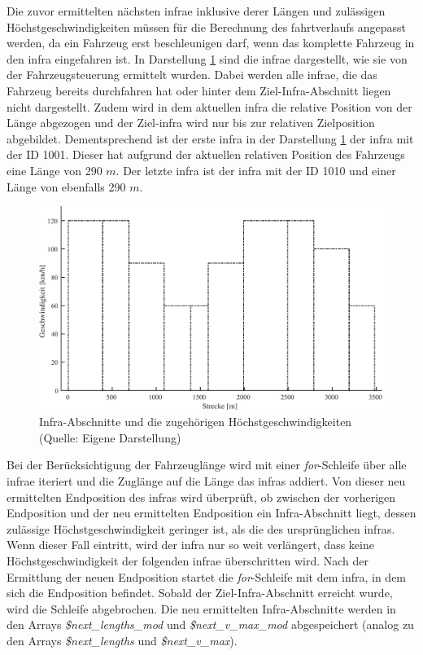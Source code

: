 Die zuvor ermittelten nächsten \ac{infra}e inklusive derer Längen und zulässigen Höchstgeschwindigkeiten müssen für die Berechnung des \Gls{fahrtverlauf}s angepasst werden, da ein Fahrzeug erst beschleunigen darf, wenn das komplette Fahrzeug in den \ac{infra} eingefahren ist. In Darstellung \ref{fig:it1} sind die \ac{infra}e dargestellt, wie sie von der Fahrzeugsteuerung ermittelt wurden. Dabei werden \mbox{alle} \ac{infra}e, die das Fahrzeug bereits durchfahren hat oder hinter dem Ziel-Infra-Abschnitt liegen nicht dargestellt. Zudem wird in dem aktuellen \ac{infra} die relative Position von der Länge abgezogen und der Ziel-\ac{infra} wird nur bis zur relativen Zielposition abgebildet. Dementsprechend ist der erste \ac{infra} in der Darstellung \ref{fig:it1} der \ac{infra} mit der ID 1001. Dieser hat aufgrund der aktuellen relativen Position des Fahrzeugs eine Länge von 290 $m$. Der letzte \ac{infra} ist der \ac{infra} mit der ID 1010 und einer Länge von ebenfalls 290 $m$.
\begin{figure}
  \includegraphics[width=\linewidth]{../images/matlab/it1.pdf}
  \caption[Infra-Abschnitte und die zugehörigen Höchstgeschwindigkeiten]{Infra-Abschnitte und die zugehörigen Höchstgeschwindigkeiten (Quelle: Eigene Darstellung)}
  \label{fig:it1}
\end{figure}

Bei der Berücksichtigung der Fahrzeuglänge wird mit einer \textit{for}-Schleife über \mbox{alle} \ac{infra}e iteriert und die Zuglänge auf die Länge das \ac{infra}s addiert. Von dieser neu ermittelten Endposition des \ac{infra}s wird überprüft, ob zwischen der vorherigen Endposition und der neu ermittelten Endposition ein Infra-Abschnitt liegt, dessen zulässige Höchstgeschwindigkeit geringer ist, als die des ursprünglichen \ac{infra}s. Wenn dieser Fall eintritt, wird der \ac{infra} nur so weit verlängert, dass keine Höchstgeschwindigkeit der folgenden \ac{infra}e überschritten wird. Nach der Ermittlung der neuen Endposition startet die \textit{for}-Schleife mit dem \ac{infra}, in dem sich die Endposition befindet. Sobald der Ziel-Infra-Abschnitt erreicht wurde, wird die Schleife abgebrochen. Die neu ermittelten Infra-Ab\-schnitte werden in den Arrays \textit{\$next\_lengths\_mod} und \textit{\$next\_v\_max\_mod} abgespeichert (analog zu den Arrays \textit{\$next\_lengths} und \textit{\$next\_v\_max}). 

